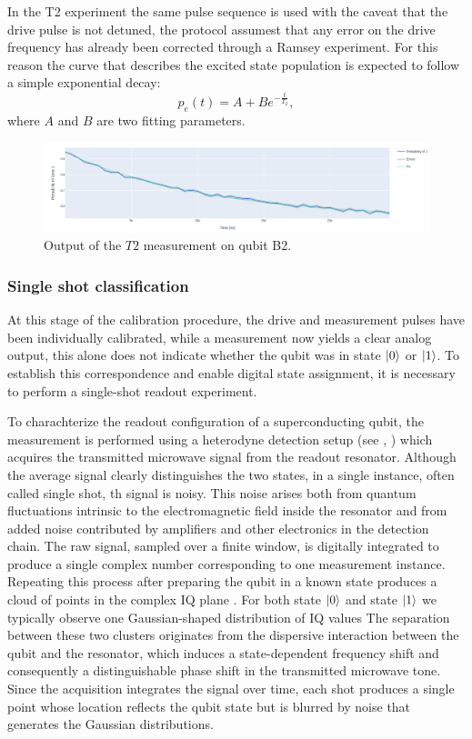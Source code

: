 In the T2 experiment the same pulse sequence is used with the caveat that the drive pulse is not detuned, the protocol assumest that any error on the drive frequency has already been corrected through a Ramsey experiment.
For this reason the curve that describes the excited state population is expected to follow a simple exponential decay:
\begin{equation}
    p_e(t) = A + Be^{-\frac{t}{T_2}},
\end{equation}
where $A$ and $B$ are two fitting parameters.

\begin{figure}[h!]
    \centering
    \includegraphics[width=\textwidth]{figures/png/t2.png}
    \caption{Output of the $T2$ measurement on qubit B2.}
    \label{fig:t2}
\end{figure}

\subsubsection{Single shot classification}\label{subsec:single_shot}
At this stage of the calibration procedure, the drive and measurement pulses have been individually calibrated, while a measurement now yields a clear analog output, this alone does not indicate whether the qubit was in state $\ket{0}$ or $\ket{1}$.
To establish this correspondence and enable digital state assignment, it is necessary to perform a single-shot readout experiment.

To charachterize the readout configuration of a superconducting qubit, the measurement is performed using a heterodyne detection setup (see \cite{gao_practical_2021}, \cite{krantz_quantum_2019}) which acquires the transmitted microwave signal from the readout resonator.
Although the average signal clearly distinguishes the two states, in a single instance, often called single shot, th signal is noisy. 
This noise arises both from quantum fluctuations intrinsic to the electromagnetic field inside the resonator and from added noise contributed by amplifiers and other electronics in the detection chain.
The raw signal, sampled over a finite window, is digitally integrated to produce a single complex number corresponding to one measurement instance.
Repeating this process after preparing the qubit in a known state produces a cloud of points in the complex IQ plane \cite{krantz_quantum_2019}.
For both state $\ket{0}$ and state $\ket{1}$ we typically observe one Gaussian-shaped distribution of IQ values The separation between these two clusters originates from the dispersive interaction between the qubit and the resonator, which induces a state-dependent frequency shift and consequently a distinguishable phase shift in the transmitted microwave tone. 
Since the acquisition integrates the signal over time, each shot produces a single point whose location reflects the qubit state but is blurred by noise that generates the Gaussian distributions.

